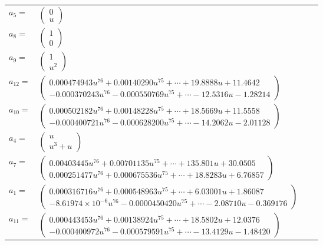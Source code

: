 \documentclass[1p]{elsarticle_modified}
\theoremstyle{definition}
\begin{document}
\begin{tabular}{m{7pt} m{180pt} m{7pt} m{180pt} }
\flushright $a_{5}=$&$\begin{pmatrix}0\\u\end{pmatrix}$ \\
\flushright $a_{8}=$&$\begin{pmatrix}1\\0\end{pmatrix}$ \\
\flushright $a_{9}=$&$\begin{pmatrix}1\\u^2\end{pmatrix}$ \\
\flushright $a_{12}=$&$\begin{pmatrix}0.000474943 u^{76}+0.00140290 u^{75}+\cdots+19.8888 u+11.4642\\-0.000370243 u^{76}-0.000550769 u^{75}+\cdots-12.5316 u-1.28214\end{pmatrix}$ \\
\flushright $a_{10}=$&$\begin{pmatrix}0.000502182 u^{76}+0.00148228 u^{75}+\cdots+18.5669 u+11.5558\\-0.000400721 u^{76}-0.000628200 u^{75}+\cdots-14.2062 u-2.01128\end{pmatrix}$ \\
\flushright $a_{4}=$&$\begin{pmatrix}u\\u^3+u\end{pmatrix}$ \\
\flushright $a_{7}=$&$\begin{pmatrix}0.00403445 u^{76}+0.00701135 u^{75}+\cdots+135.801 u+30.0505\\0.000251477 u^{76}+0.000675536 u^{75}+\cdots+18.8283 u+6.76857\end{pmatrix}$ \\
\flushright $a_{1}=$&$\begin{pmatrix}0.000316716 u^{76}+0.000548963 u^{75}+\cdots+6.03001 u+1.86087\\-8.61974\times10^{-6} u^{76}-0.0000450420 u^{75}+\cdots-2.08710 u-0.369176\end{pmatrix}$ \\
\flushright $a_{11}=$&$\begin{pmatrix}0.000443453 u^{76}+0.00138924 u^{75}+\cdots+18.5802 u+12.0376\\-0.000400972 u^{76}-0.000579591 u^{75}+\cdots-13.4129 u-1.48420\end{pmatrix}$ \\

\end{tabular}
\end{document}
